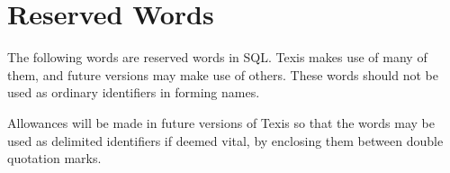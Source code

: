 %
%
%
%
%
%
%
\section{Reserved Words}

The following words are reserved words in SQL.  Texis makes use of
many of them, and future versions may make use of others.  These words
should not be used as ordinary identifiers in forming names.

Allowances will be made in future versions of Texis so that the words
may be used as delimited identifiers if deemed vital, by enclosing
them between double quotation marks.

